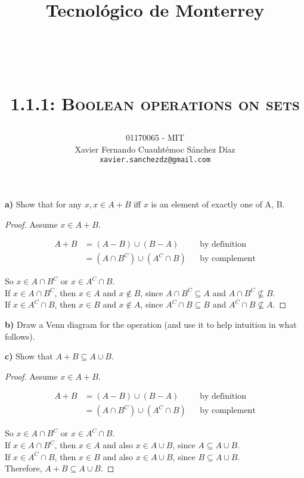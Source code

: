 \documentclass[titlepage, letterpaper, fleqn]{article}
\title{
\vspace{1in}
\textbf{Tecnológico de Monterrey} \\
\vspace{0.5in}
\textmd{\mahclass} \\
\large{\textit{\mahteacher}} \\
\vspace{0.5in}
\textsc{\mahtitle}\\
\textsc{1.1.1: Boolean operations on sets}\\
\author{01170065  - MIT \\
Xavier Fernando Cuauhtémoc Sánchez Díaz \\
\texttt{xavier.sanchezdz@gmail.com}}
\date{\mahdate}
}
\newcommand{\spacepls}{\vspace{5mm}}
\def\firstcircle{(0,0) circle (1.5cm)}
\def\secondcircle{(0:2cm) circle (1.5cm)}
\begin{document}
\begin{titlepage}
\maketitle
\end{titlepage}

%
%

{\large \textbf{a)} Show that for any \(x, x \in A + B\) iff \(x\) is an element of exactly one of A, B.}

\begin{proof}
  Assume \(x \in A + B\).

  \begin{align*}
  A + B &= (A-B) \cup (B-A)     &&\text{by definition}
  \\ &= (A \cap B^C) \cup (A^C \cap B)  &&\text{by complement}
  \end{align*}

  So \(x \in A \cap B^C\) or \(x \in A^C \cap B\). \\
  If \(x \in A \cap B^C\), then \(x \in A\) and \(x \not \in B\), since \(A \cap B^C \subseteq A\) and \(A \cap B^C \not \subseteq B\). \\
  If \(x \in A^C \cap B\), then \(x \in B\) and \(x \not \in A\), since \(A^C \cap B \subseteq B\) and \(A^C \cap B \not \subseteq A\).
\end{proof}

\spacepls

{\large \textbf{b)} Draw a Venn diagram for the operation (and use it to help intuition in what follows).}

\spacepls


\spacepls

{\large \textbf{c)} Show that \(A + B \subseteq A \cup B\).}

\begin{proof}
	Assume \(x \in A + B\).

  \begin{align*}
  A + B &= (A-B) \cup (B-A)     &&\text{by definition}
  \\ &= (A \cap B^C) \cup (A^C \cap B)  &&\text{by complement}
  \end{align*}

  So \(x \in A \cap B^C\) or \(x \in A^C \cap B\). \\
  If \(x \in A \cap B^C\), then \(x \in A\) and also \(x \in A \cup B\), since \(A \subseteq A \cup B\). \\
  If \(x \in A^C \cap B\), then \(x \in B\) and also \(x \in A \cup B\), since \(B \subseteq A \cup B\). \\
  Therefore, \(A + B \subseteq A \cup B\).
\end{proof}
\end{document}

